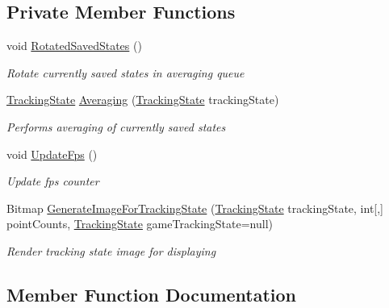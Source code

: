 \subsection*{Private Member Functions}
\begin{DoxyCompactItemize}
\item 
void \mbox{\hyperlink{class_chess_tracking_1_1_controlling_elements_1_1_tracking_result_processing_af43bef9696fb2fa7799a9140c33589dd}{Rotated\+Saved\+States}} ()
\begin{DoxyCompactList}\small\item\em Rotate currently saved states in averaging queue \end{DoxyCompactList}\item 
\mbox{\hyperlink{class_chess_tracking_1_1_multithreading_messages_1_1_tracking_state}{Tracking\+State}} \mbox{\hyperlink{class_chess_tracking_1_1_controlling_elements_1_1_tracking_result_processing_adcab7816b6b58b4c0ffc426cba1057b5}{Averaging}} (\mbox{\hyperlink{class_chess_tracking_1_1_multithreading_messages_1_1_tracking_state}{Tracking\+State}} tracking\+State)
\begin{DoxyCompactList}\small\item\em Performs averaging of currently saved states \end{DoxyCompactList}\item 
void \mbox{\hyperlink{class_chess_tracking_1_1_controlling_elements_1_1_tracking_result_processing_a398d83dfb5237557cd02ab5f0a99a5e2}{Update\+Fps}} ()
\begin{DoxyCompactList}\small\item\em Update fps counter \end{DoxyCompactList}\item 
Bitmap \mbox{\hyperlink{class_chess_tracking_1_1_controlling_elements_1_1_tracking_result_processing_a2924b01cfd6f25bc056d62a87144e147}{Generate\+Image\+For\+Tracking\+State}} (\mbox{\hyperlink{class_chess_tracking_1_1_multithreading_messages_1_1_tracking_state}{Tracking\+State}} tracking\+State, int\mbox{[},\mbox{]} point\+Counts, \mbox{\hyperlink{class_chess_tracking_1_1_multithreading_messages_1_1_tracking_state}{Tracking\+State}} game\+Tracking\+State=null)
\begin{DoxyCompactList}\small\item\em Render tracking state image for displaying \end{DoxyCompactList}\end{DoxyCompactItemize}


\subsection{Member Function Documentation}
\mbox{\label{class_chess_tracking_1_1_controlling_elements_1_1_tracking_result_processing_adcab7816b6b58b4c0ffc426cba1057b5}} 
